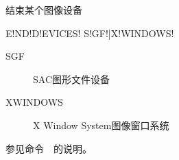 \label{cmd:enddevices}

结束某个图像设备

\begin{SACSTX}
E!ND!D!EVICES! S!GF!|X!WINDOWS!
\end{SACSTX}

\begin{description}
\item [SGF] SAC图形文件设备
\item [XWINDOWS] X Window System图像窗口系统
\end{description}

参见命令~~的说明。

